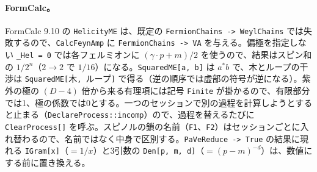\documentclass[a4paper,10pt]{ltjsarticle}
\begin{document}
\paragraph{FormCalc。}FormCalc 9.10 の \texttt{HelicityME} は、既定の \texttt{FermionChains -> WeylChains} では失敗するので、\texttt{CalcFeynAmp} に \texttt{FermionChains -> VA} を与える。偏極を指定しない \texttt{\_Hel = 0} では各フェルミオンに $(\gamma\cdot p+m)/2$ を使うので、結果はスピン和の $1/2^n$（$2\to2$ で $1/16$）になる。\texttt{SquaredME[a, b]} は $a^*b$ で、木とループの干渉は \texttt{SquaredME[}木\texttt{, }ループ\texttt{]} で得る（逆の順序では虚部の符号が逆になる）。紫外の極の $(D-4)$ 倍から来る有理項には記号 \texttt{Finite} が掛かるので、有限部分では1、極の係数では0とする。一つのセッションで別の過程を計算しようとすると止まる（\texttt{DeclareProcess::incomp}）ので、過程を替えるたびに \texttt{ClearProcess[]} を呼ぶ。スピノルの鎖の名前（\texttt{F1}、\texttt{F2}）はセッションごとに入れ替わるので、名前ではなく中身で区別する。\texttt{PaVeReduce -> True} の結果に現れる \texttt{IGram[x]}（$=1/x$）と3引数の \texttt{Den[p, m, d]}（$=(p-m)^{-d}$）は、数値にする前に置き換える。
\end{document}
